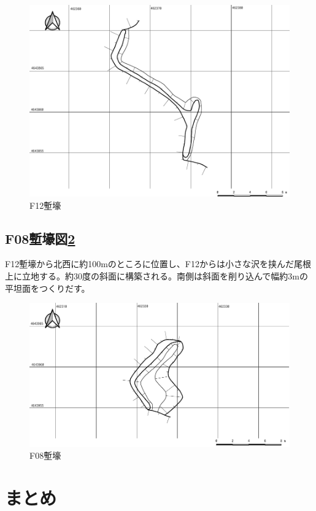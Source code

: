 \documentclass[14Q]{jsarticle}
\begin{document}
\begin{figure}[h]
\centering
\includegraphics[width=160truemm]{fig/F12.pdf}
\caption{F12塹壕}
\label{f12}
\end{figure}

\subsection{F08塹壕図\ref{f08}}
F12塹壕から北西に約100mのところに位置し、F12からは小さな沢を挟んだ尾根上に立地する。約30度の斜面に構築される。南側は斜面を削り込んで幅約3mの平坦面をつくりだす。

\begin{figure}[h]
\centering
\includegraphics[width=160truemm]{fig/F08.pdf}
\caption{F08塹壕}
\label{f08}
\end{figure}

\section{まとめ}
\end{document}
